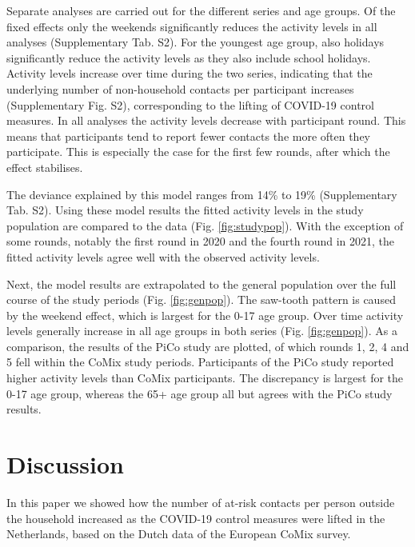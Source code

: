\documentclass[fleqn,10pt]{wlscirep}
\begin{document}

Separate analyses are carried out for the different series and age groups. Of the fixed effects only the weekends significantly reduces the activity levels in all analyses (Supplementary Tab. S2). For the youngest age group, also holidays significantly reduce the activity levels as they also include school holidays. Activity levels increase over time during the two series, indicating that the underlying number of non-household contacts per participant increases (Supplementary Fig. S2), corresponding to the lifting of COVID-19 control measures. In all analyses the activity levels decrease with participant round. This means that participants tend to report fewer contacts the more often they participate. This is especially the case for the first few rounds, after which the effect stabilises.

The deviance explained by this model ranges from 14\% to 19\% (Supplementary Tab. S2). Using these model results the fitted activity levels in the study population are compared to the data (Fig. \ref{fig:studypop}). With the exception of some rounds, notably the first round in 2020 and the fourth round in 2021, the fitted activity levels agree well with the observed activity levels.


Next, the model results are extrapolated to the general population over the full course of the study periods (Fig. \ref{fig:genpop}). The saw-tooth pattern is caused by the weekend effect, which is largest for the 0-17 age group. Over time activity levels generally increase in all age groups in both series (Fig. \ref{fig:genpop}). As a comparison, the results of the PiCo study \cite{Backer_2021} are plotted, of which rounds 1, 2, 4 and 5 fell within the CoMix study periods. Participants of the PiCo study reported higher activity levels than CoMix participants. The discrepancy is largest for the 0-17 age group, whereas the 65+ age group all but agrees with the PiCo study results.


\section*{Discussion}

In this paper we showed how the number of at-risk contacts per person outside the household increased as the COVID-19 control measures were lifted in the Netherlands, based on the Dutch data of the European CoMix survey.
\end{document}
